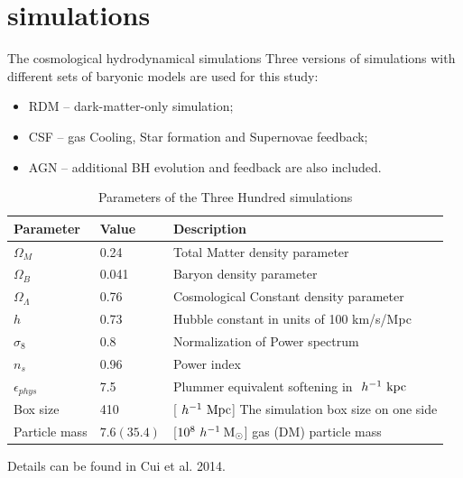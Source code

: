 \documentclass[aspectratio=43]{beamer}
\newcommand{\hMsun}{~h^{-1}\>{\rm M_\odot}}
\newcommand{\Mpc}{~h^{-1}~{\rm Mpc}}
\newcommand{\Kpc}{~h^{-1}~{\rm kpc}}
\begin{document}
\section{simulations}
\begin{frame}{The cosmological hydrodynamical simulations}
Three versions of simulations with different sets of baryonic models are used for this study:
\begin{itemize}
    \item RDM -- dark-matter-only simulation; 
    \item CSF -- gas Cooling, Star formation and Supernovae feedback;
    \item AGN -- additional BH evolution and feedback are also included.
\end{itemize}
\vspace{-0.6cm}
\begin{table}
\fontsize{9}{9}\selectfont
\caption{Parameters of the Three Hundred simulations}
\begin{tabular}{lll}
  \hline
  Parameter& Value & Description\\
  \hline
  $\Omega_M$ & 0.24 & Total Matter density parameter\\
  $\Omega_B$ & 0.041 & Baryon density parameter\\
  $\Omega_\Lambda$ & 0.76 & Cosmological Constant density parameter\\
  $h$ & 0.73  & Hubble constant in units of 100 km/s/Mpc\\
  $\sigma_8$ & 0.8 & Normalization of Power spectrum\\
  $n_s$ & 0.96  & Power index\\
  $\epsilon_{phys}$ & 7.5 & Plummer equivalent softening in $\Kpc$ \\
  Box size & \alert{410} & [$\Mpc$] The simulation box size on one side \\
  Particle mass & $7.6 (35.4) $ & [$10^8 \hMsun$] gas (DM) particle mass \\
  \hline
\end{tabular}
\end{table}
Details can be found in Cui et al. 2014.
\end{frame}
\end{document}
